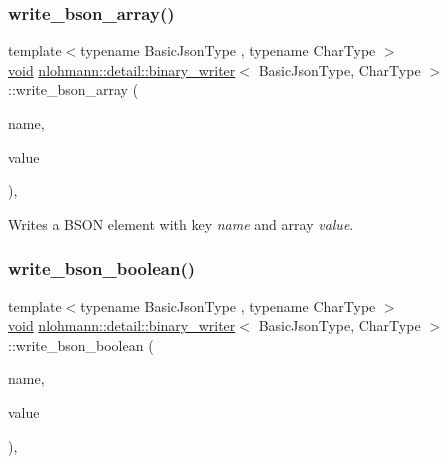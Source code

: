 \subsubsection{\texorpdfstring{write\_bson\_array()}{write\_bson\_array()}}
{\footnotesize\ttfamily template$<$typename Basic\+Json\+Type , typename Char\+Type $>$ \\
\mbox{\hyperlink{namespacenlohmann_1_1detail_a59fca69799f6b9e366710cb9043aa77d}{void}} \mbox{\hyperlink{classnlohmann_1_1detail_1_1binary__writer}{nlohmann\+::detail\+::binary\+\_\+writer}}$<$ Basic\+Json\+Type, Char\+Type $>$\+::write\+\_\+bson\+\_\+array (\begin{DoxyParamCaption}\item[{const \mbox{\hyperlink{classnlohmann_1_1detail_1_1binary__writer_a29f2ae7a5c4a8c1dae47b3b2310de8a8}{string\+\_\+t}} \&}]{name,  }\item[{const typename Basic\+Json\+Type\+::array\+\_\+t \&}]{value }\end{DoxyParamCaption})\hspace{0.3cm}{\ttfamily [inline]}, {\ttfamily [private]}}



Writes a B\+S\+ON element with key {\itshape name} and array {\itshape value}. 

\mbox{\label{classnlohmann_1_1detail_1_1binary__writer_ae099435e1df3096e0fc78333282f8f67}} 
\subsubsection{\texorpdfstring{write\_bson\_boolean()}{write\_bson\_boolean()}}
{\footnotesize\ttfamily template$<$typename Basic\+Json\+Type , typename Char\+Type $>$ \\
\mbox{\hyperlink{namespacenlohmann_1_1detail_a59fca69799f6b9e366710cb9043aa77d}{void}} \mbox{\hyperlink{classnlohmann_1_1detail_1_1binary__writer}{nlohmann\+::detail\+::binary\+\_\+writer}}$<$ Basic\+Json\+Type, Char\+Type $>$\+::write\+\_\+bson\+\_\+boolean (\begin{DoxyParamCaption}\item[{const \mbox{\hyperlink{classnlohmann_1_1detail_1_1binary__writer_a29f2ae7a5c4a8c1dae47b3b2310de8a8}{string\+\_\+t}} \&}]{name,  }\item[{const bool}]{value }\end{DoxyParamCaption})\hspace{0.3cm}{\ttfamily [inline]}, {\ttfamily [private]}}



